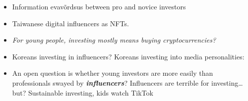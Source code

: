 \documentclass[
  letterpaper,
  DIV=11,
  numbers=noendperiod]{scrartcl}
\begin{document}
\begin{itemize}
\item
  Information evavõrdsus between pro and novice investors
\item
  \citet{openseaTopTaiwanInfluencers2022} Taiwanese digital influencers
  as NFTs.
\item
  \emph{For young people, investing mostly means buying
  cryptocurrencies?}
\item
  Koreans investing in influencers? Koreans investing into media
  personalities: \citet{yuqingzhao2021}
\item
  An open question is whether young investors are more easily than
  professionals swayed by \textbf{\emph{influencers}}? Influencers are
  terrible for investing\ldots{} but? Sustainable investing, kids watch
  TikTok \citet{TikTokItImportantWe}


\end{itemize}
\end{document}
